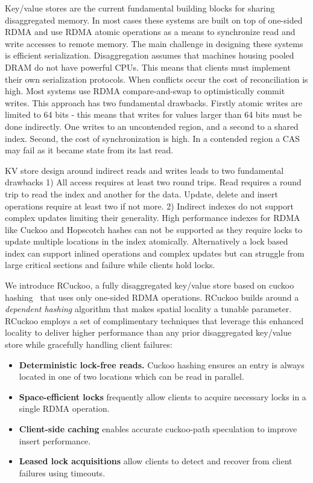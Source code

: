 Key/value stores are the current fundamental building blocks for sharing disaggregated memory. In
most cases these systems are built on top of one-sided RDMA and use RDMA atomic operations as a
means to synchronize read and write accesses to remote memory. The main challenge in designing these
systems is efficient serialization. Disaggregation assumes that machines housing pooled DRAM do not
have powerful CPUs. This means that clients must implement their own serialization protocols. When
conflicts occur the cost of reconciliation is high. Most systems use RDMA compare-and-swap to
optimistically commit writes. This approach has two fundamental drawbacks. Firstly atomic writes are
limited to 64 bits - this means that writes for values larger than 64 bits must be done indirectly.
One writes to an uncontended region, and a second to a shared index. Second, the cost of
synchronization is high. In a contended region a CAS may fail as it became state from its last read.

KV store design around indirect reads and writes leads to two fundamental drawbacks 1) All access
requires at least two round trips. Read requires a round trip to read the index and another for the
data. Update, delete and insert operations require at least two if not more. 2) Indirect indexes do
not support complex updates limiting their generality. High performance indexes for RDMA like Cuckoo
and Hopscotch hashes can not be supported as they require locks to update multiple locations in the
index atomically.  Alternatively a lock based index can support inlined operations and complex
updates but can struggle from large critical sections and failure while clients hold locks.


We introduce RCuckoo, a fully disaggregated key/value store based on
cuckoo hashing~\cite{cuckoo} that
uses only one-sided RDMA operations.
RCuckoo builds
around a \emph{dependent hashing} algorithm that makes spatial
locality a tunable parameter.
RCuckoo employs a set of
complimentary techniques that leverage this enhanced locality to deliver higher performance than any prior
disaggregated key/value store while gracefully handling client
failures:

\begin{itemize}
\item{\textbf{Deterministic lock-free reads.}  Cuckoo hashing ensures
  an entry is always located in one of two locations which can be
  read in parallel.}

\item{\textbf{Space-efficient locks} frequently allow clients to acquire necessary 
  locks in a single RDMA operation.}

\item{\textbf{Client-side caching} enables accurate cuckoo-path
  speculation to improve insert performance.}

\item{\textbf{Leased lock acquisitions} allow clients to detect
  and recover from client failures using timeouts.}
\end{itemize}

